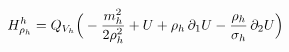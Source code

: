 \documentclass[preview]{standalone}
\begin{document}
\begin{align*}
\special{dvisvgm:raw <g id='unique000'>}H^h_{\rho_h}=Q_{V_h}\Big(-\frac{m_h^2}{2\rho_h^2}+U+\rho_h\,\partial_1U-\frac{\rho_h}{\sigma_h}\,\partial_2U\Big)\special{dvisvgm:raw </g>}
\end{align*}
\end{document}
